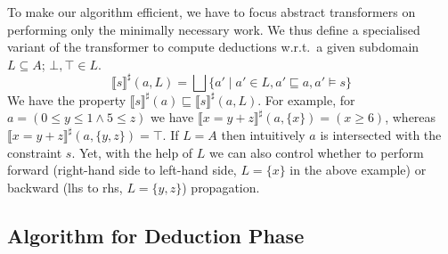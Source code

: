 To make our algorithm efficient, we have to focus abstract
transformers on performing only the minimally necessary
work. 
%
We thus define a specialised variant of the transformer to compute
deductions w.r.t.\ a given subdomain $L\subseteq A$; $\bot,\top \in L$.
\[\llbracket s \rrbracket^\sharp(a,L)=\bigsqcup \{a'\mid a'\in L, a' \sqsubseteq a, a'\models s\}\]
We have the property $\llbracket s \rrbracket^\sharp(a)\sqsubseteq \llbracket s \rrbracket^\sharp(a,L)$.
%
For example, for
$a=(0\leq y \leq 1 \wedge 5\leq z)$ we have
$\llbracket x=y+z\rrbracket^\sharp(a,\{x\})=(x\geq 6)$, whereas
$\llbracket x=y+z\rrbracket^\sharp(a,\{y,z\})=\top$.
%
If $L=A$ then intuitively $a$ is intersected with the constraint $s$.
Yet, with the help of $L$ we can also control whether to perform
forward (right-hand side to left-hand side, $L=\{x\}$ in the above
example) or backward (lhs to rhs, $L=\{y,z\}$) propagation.





\subsection{Algorithm for Deduction Phase}
%


